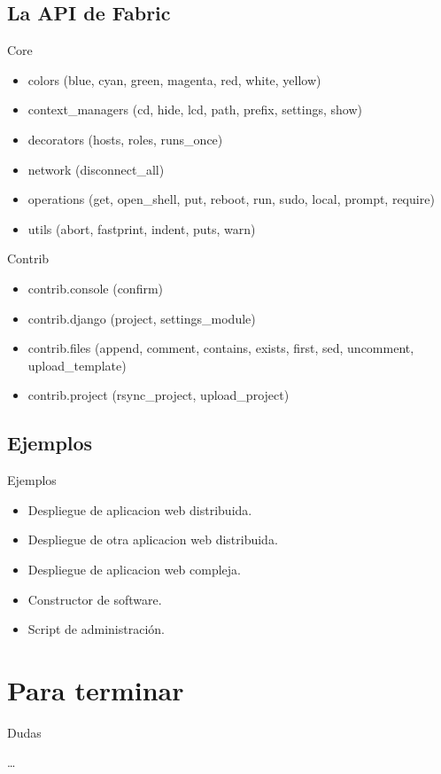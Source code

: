 \documentclass[10pt]{beamer}
\begin{document}
  \subsection*{La API de Fabric}
  \begin{frame}{Core}
    \begin{itemize}
      \item colors (blue, cyan, green, magenta, red, white, yellow)
      \item context\_managers (cd, hide, lcd, path, prefix, settings, show)
      \item decorators (hosts, roles, runs\_once)
      \item network (disconnect\_all)
      \item operations (get, open\_shell, put, reboot, run, sudo, local, prompt, require)
      \item utils (abort, fastprint, indent, puts, warn)
    \end{itemize}
  \end{frame}

  \begin{frame}{Contrib}
    \begin{itemize}
      \item contrib.console (confirm)
      \item contrib.django (project, settings\_module)
      \item contrib.files (append, comment, contains, exists, first, sed, uncomment, upload\_template)
      \item contrib.project (rsync\_project, upload\_project)
    \end{itemize}
  \end{frame}
  
  \subsection*{Ejemplos}
  \begin{frame}{Ejemplos}
    \begin{itemize}
      \item Despliegue de aplicacion web distribuida.
      \item Despliegue de otra aplicacion web distribuida.
      \item Despliegue de aplicacion web compleja.
      \item Constructor de software.
      \item Script de administración.
    \end{itemize}
  \end{frame}

  \section*{Para terminar}

  \begin{frame}{Dudas}
    \begin{center}
      \dots
    \end{center}
  \end{frame}
\end{document}
